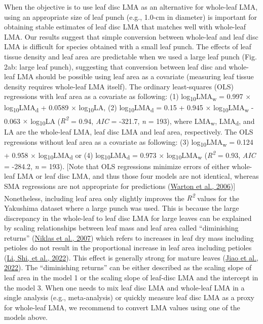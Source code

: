 \documentclass[
  12pt,
  a4paper,
,tablecaptionabove
]{scrartcl}
\begin{document}
When the objective is to use leaf disc LMA as an alternative for whole-leaf LMA, using an appropriate size of leaf punch (e.g., 1.0-cm in diameter) is important for obtaining stable estimates of leaf disc LMA that matches well with whole-leaf LMA.
Our results suggest that simple conversion between whole-leaf and leaf disc LMA is difficult for species obtained with a small leaf punch.
The effects of leaf tissue density and leaf area are predictable when we used a large leaf punch (Fig. 2ab: large leaf punch), suggesting that conversion between leaf disc and whole-leaf LMA should be possible using leaf area as a covariate (measuring leaf tissue density requires whole-leaf LMA itself).
The ordinary least-squares (OLS) regressions with leaf area as a covariate as following:
(1) log\textsubscript{10}LMA\textsubscript{w} = 0.997 \(\times\) log\textsubscript{10}LMA\textsubscript{d} + 0.0589 \(\times\) log\textsubscript{10}LA,
(2) log\textsubscript{10}LMA\textsubscript{d} = 0.15 + 0.945 \(\times\) log\textsubscript{10}LMA\textsubscript{w} - 0.063 \(\times\) log\textsubscript{10}LA (\emph{R\textsuperscript{2}} = 0.94, \emph{AIC} = -321.7, \emph{n} = 193),
where LMA\textsubscript{w}, LMA\textsubscript{d}, and LA are the whole-leaf LMA, leaf disc LMA and leaf area, respectively.
The OLS regressions without leaf area as a covariate as following:
(3) log\textsubscript{10}LMA\textsubscript{w} = 0.124 + 0.958 \(\times\) log\textsubscript{10}LMA\textsubscript{d} or
(4) log\textsubscript{10}LMA\textsubscript{d} = 0.973 \(\times\) log\textsubscript{10}LMA\textsubscript{w}
(\emph{R\textsuperscript{2}} = 0.93, \emph{AIC} = -284.2, \emph{n} = 193).
{[}Note that OLS regressions minimize errors of either whole-leaf LMA or leaf disc LMA, and thus those four models are not identical, whereas SMA regressions are not appropriate for predictions (\protect\hyperlink{ref-Warton2006}{Warton et al., 2006}){]}
Nonetheless, including leaf area only slightly improves the \emph{R\textsuperscript{2}} values for the Yakushima dataset where a large punch was used.
This is because the large discrepancy in the whole-leaf to leaf disc LMA for large leaves can be explained by scaling relationships between leaf mass and leaf area called ``diminishing returns'' (\protect\hyperlink{ref-Niklas2007}{Niklas et al., 2007}) which refers to increases in leaf dry mass including petioles do not result in the proportional increase in leaf area including petioles (\protect\hyperlink{ref-Li2022}{Li, Shi, et al., 2022}).
This effect is generally strong for mature leaves (\protect\hyperlink{ref-Jiao2022}{Jiao et al., 2022}).
The ``diminishing returns'' can be either described as the scaling slope of leaf area in the model 1 or the scaling slope of leaf-disc LMA and the intercept in the model 3.
When one needs to mix leaf disc LMA and whole-leaf LMA in a single analysis (e.g., meta-analysis) or quickly measure leaf disc LMA as a proxy for whole-leaf LMA, we recommend to convert LMA values using one of the models above.
\end{document}
